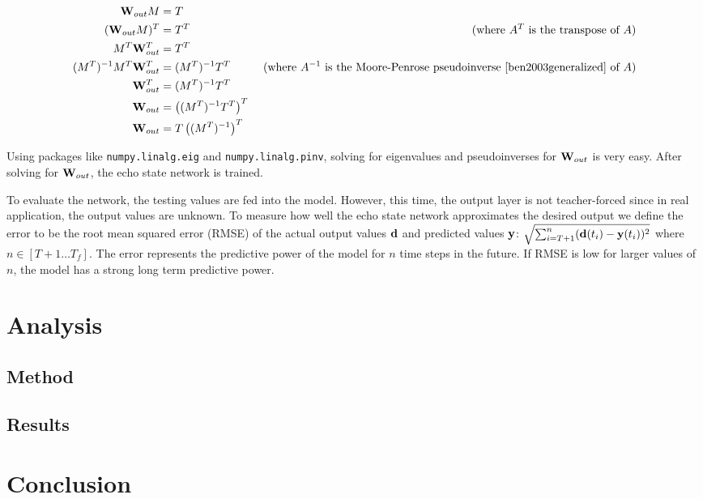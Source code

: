 \documentclass{article}
\begin{document}
\begin{align*}
    \mathbf{W}_{out} M &= T \\
    (\mathbf{W}_{out} M)^T &= T^T & \text{ (where $A^T$ is the transpose of $A$)} \\
    M^T \mathbf{W}_{out}^T &= T^T \\
    (M^T)^{-1} M^T \mathbf{W}_{out}^T &= (M^T)^{-1} T^T & \text{ (where $A^{-1}$ is the Moore-Penrose pseudoinverse \cite{ben2003generalized} of $A$)} \\
    \mathbf{W}_{out}^T &= (M^T)^{-1} T^T \\
    \mathbf{W}_{out} &= \left((M^T)^{-1} T^T\right)^T \\
    \mathbf{W}_{out} &= T \left((M^T)^{-1}\right)^T
\end{align*}

Using packages like \texttt{numpy.linalg.eig} and 
\texttt{numpy.linalg.pinv}, solving for eigenvalues and
pseudoinverses for $\mathbf{W}_{out}$ is very 
easy. After solving for $\mathbf{W}_{out}$, the echo state network is trained.

To evaluate the network, the testing values are fed into the model. 
However, this time, the output layer is not teacher-forced since 
in real application, the output values are unknown. 
To measure how well the echo state network approximates the desired output
we define the error to be the root mean squared error (RMSE) of the
actual output values $\mathbf{d}$ and
predicted values $\mathbf{y}$: $\sqrt{\sum_{i=T+1}^{n} (\mathbf{d}(t_i) - \mathbf{y}(t_i))^2}$ 
where $n \in [T+1 \dots T_f]$. The error represents the predictive power
of the model for $n$ time steps in the future. If RMSE is low for larger 
values of $n$, the model has a strong long term predictive power.



\section{Analysis}

\subsection{Method}
\subsection{Results}

\section{Conclusion}



\end{document}

